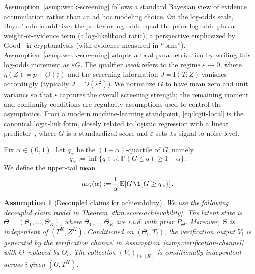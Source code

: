 \documentclass[twocolumn]{scholar7}
\newtheorem{assumption}[theorem]{Assumption}
\newcommand{\E}{\mathbb{E}}
\newcommand{\Prob}{\mathbb{P}}
\newcommand{\I}{\mathrm{I}}
\newcommand{\bracks}[1]{\left[#1\right]}
\newcommand{\idx}[1]{\bracks{#1}} %
\begin{document}
Assumption~\ref{asmp:weak-screening} follows a standard Bayesian view of evidence accumulation rather than an ad hoc modeling choice.
On the log-odds scale, Bayes' rule is additive: the posterior log-odds equal the prior log-odds plus a weight-of-evidence term (a log-likelihood ratio), a perspective emphasized by Good~\cite{good1950probability} in cryptanalysis (with evidence measured in ``bans'').
Assumption~\ref{asmp:weak-screening} adopts a local parametrization by writing this log-odds increment as $\varepsilon G$.
The qualifier \emph{weak} refers to the regime $\varepsilon\to 0$, where $\eta(Z)=p+O(\varepsilon)$ and the screening information $J=\I(T;Z)$ vanishes accordingly (typically $J=O(\varepsilon^2)$).
We normalize $G$ to have mean zero and unit variance so that $\varepsilon$ captures the overall screening strength; the remaining moment and continuity conditions are regularity assumptions used to control the asymptotics.
From a modern machine-learning standpoint, \eqref{eq:logit-local} is the canonical logit-link form, closely related to logistic regression with a linear predictor~\cite{cox1958regression}, where $G$ is a standardized score and $\varepsilon$ sets its signal-to-noise level.



Fix $\alpha\in(0,1)$.
Let $q_\alpha$ be the $(1-\alpha)$-quantile of $G$, namely
\[
q_\alpha:=\inf\{q\in\mathbb{R}: \Prob(G\le q)\ge 1-\alpha\}.
\]
We define the upper-tail mean
\begin{equation}
\label{eq:tail-mean}
m_G(\alpha):=\frac{1}{\alpha}\,\E\!\bracks{G\,\1\{G\ge q_\alpha\}}.
\end{equation}

\begin{assumption}[Decoupled claims for achievability]
\label{asmp:decoupled-claims}
We use the following decoupled claim model in Theorem~\ref{thm:score-achievability}.
The latent state is $\Theta=(\Theta_1,\dots,\Theta_K)$, where $\Theta_1,\dots,\Theta_K$ are i.i.d. with prior $P_\Theta$.
Moreover, $\Theta$ is independent of $(T^K,Z^K)$.
Conditioned on $(\Theta_i,T_i)$, the verification output $V_i$ is generated by the verification channel in Assumption~\ref{asmp:verification-channel} with $\Theta$ replaced by $\Theta_i$.
The collection $(V_i)_{i\in\idx{K}}$ is conditionally independent across $i$ given $(\Theta,T^K)$.
\end{assumption}
\end{document}
